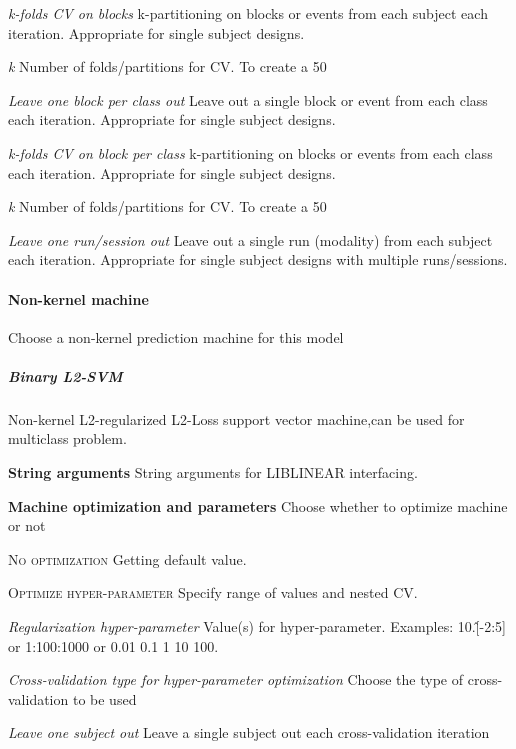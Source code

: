 \textit{k-folds CV on blocks}
k-partitioning on blocks or events from each subject each iteration. Appropriate for single subject designs.


\textit{k}
Number of folds/partitions for CV. To create a 50%


\textit{Leave one block per class out}
Leave out a single block or event from each class each iteration. Appropriate for single subject designs.


\textit{k-folds CV on block per class}
k-partitioning on blocks or events from each class each iteration. Appropriate for single subject designs.


\textit{k}
Number of folds/partitions for CV. To create a 50%


\textit{Leave one run/session out}
Leave out a single run (modality) from each subject each iteration. Appropriate for single subject designs with multiple runs/sessions.


\paragraph{Non-kernel machine}
Choose a non-kernel prediction machine for this model


\subparagraph{Binary L2-SVM}
Non-kernel L2-regularized L2-Loss support vector machine,can be used for multiclass problem.


\textbf{String arguments}
String arguments for LIBLINEAR interfacing.


\textbf{Machine optimization and parameters}
Choose whether to optimize machine or not


\textsc{No optimization}
Getting default value.


\textsc{Optimize hyper-parameter}
Specify range of values and nested CV.


\textsl{Regularization hyper-parameter}
Value(s) for hyper-parameter. Examples: 10.\^[-2:5] or 1:100:1000 or 0.01 0.1 1 10 100.


\textsl{Cross-validation type for hyper-parameter optimization}
Choose the type of cross-validation to be used


\textit{Leave one subject out}
Leave a single subject out each cross-validation iteration


